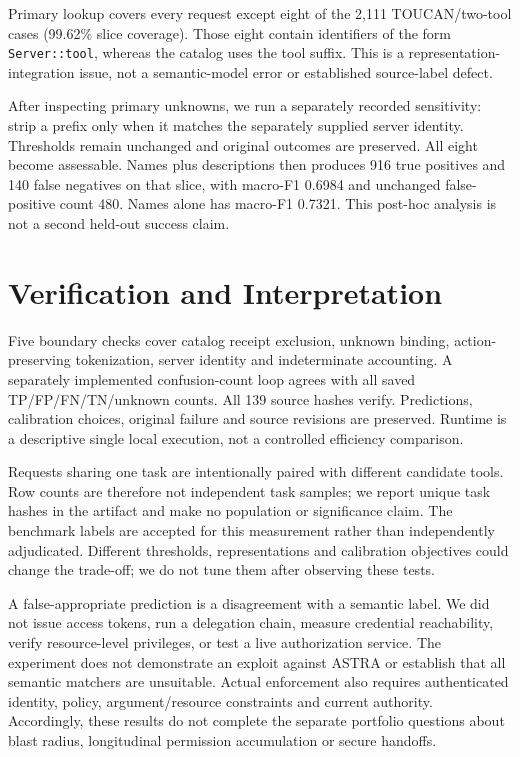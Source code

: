 \documentclass[sigconf,nonacm]{acmart}
\begin{document}
Primary lookup covers every request except eight of the 2,111 TOUCAN/two-tool cases (99.62\% slice coverage). Those eight contain identifiers of the form \texttt{Server::tool}, whereas the catalog uses the tool suffix. This is a representation-integration issue, not a semantic-model error or established source-label defect.

After inspecting primary unknowns, we run a separately recorded sensitivity: strip a prefix only when it matches the separately supplied server identity. Thresholds remain unchanged and original outcomes are preserved. All eight become assessable. Names plus descriptions then produces 916 true positives and 140 false negatives on that slice, with macro-F1 0.6984 and unchanged false-positive count 480. Names alone has macro-F1 0.7321. This post-hoc analysis is not a second held-out success claim.

\section{Verification and Interpretation}
Five boundary checks cover catalog receipt exclusion, unknown binding, action-preserving tokenization, server identity and indeterminate accounting. A separately implemented confusion-count loop agrees with all saved TP/FP/FN/TN/unknown counts. All 139 source hashes verify. Predictions, calibration choices, original failure and source revisions are preserved. Runtime is a descriptive single local execution, not a controlled efficiency comparison.

Requests sharing one task are intentionally paired with different candidate tools. Row counts are therefore not independent task samples; we report unique task hashes in the artifact and make no population or significance claim. The benchmark labels are accepted for this measurement rather than independently adjudicated. Different thresholds, representations and calibration objectives could change the trade-off; we do not tune them after observing these tests.

A false-appropriate prediction is a disagreement with a semantic label. We did not issue access tokens, run a delegation chain, measure credential reachability, verify resource-level privileges, or test a live authorization service. The experiment does not demonstrate an exploit against ASTRA or establish that all semantic matchers are unsuitable. Actual enforcement also requires authenticated identity, policy, argument/resource constraints and current authority. Accordingly, these results do not complete the separate portfolio questions about blast radius, longitudinal permission accumulation or secure handoffs.
\end{document}
